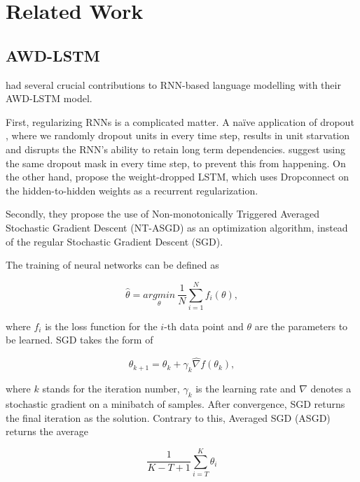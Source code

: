 \chapter{Related Work}
\label{chapter:related_work}

\section{AWD-LSTM}
\label{section:related_work:awd_lstm}
\citet{merity2017regularizing} had several crucial contributions to RNN-based language modelling with their AWD-LSTM model.

First, regularizing RNNs is a complicated matter. A na\"ive application of dropout \citep{srivastava2014dropout}, where we randomly dropout units in every time step, results in unit starvation and disrupts the RNN's ability to retain long term dependencies. \citet{gal2016theoretically} suggest using the same dropout mask in every time step, to prevent this from happening. On the other hand, \citet{merity2017regularizing} propose the weight-dropped LSTM, which uses Dropconnect \citep{wan2013regularization} on the hidden-to-hidden weights as a recurrent regularization.

Secondly, they propose the use of Non-monotonically Triggered Averaged Stochastic Gradient Descent (NT-ASGD) as an optimization algorithm, instead of the regular Stochastic Gradient Descent (SGD).

The training of neural networks can be defined as

\begin{displaymath}
    \hat{\theta} = \underset{\theta}{argmin} \ \frac{1}{N} \sum^N_{i=1} f_i(\theta),
\end{displaymath}

where $ f_i $ is the loss function for the $ i $-th data point and $ \theta $ are the parameters to be learned. SGD takes the form of

\begin{displaymath}
    \theta_{k+1} = \theta_k + \gamma_k \hat{\nabla} f(\theta_k),
\end{displaymath}

where $ k $ stands for the iteration number, $ \gamma_k $ is the learning rate and $ \hat{\nabla} $ denotes a stochastic gradient on a minibatch of samples. After convergence, SGD returns the final iteration as the solution. Contrary to this, Averaged SGD (ASGD) returns the average

\begin{displaymath}
    \frac{1}{K-T+1} \sum_{i=T}^K \theta_i
\end{displaymath}


